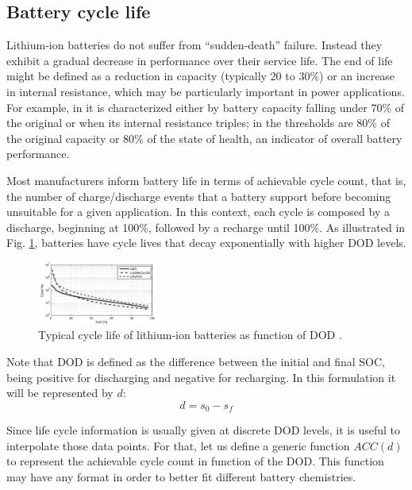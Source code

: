 \documentclass{ieeeaccess}
\begin{document}
    \subsection{Battery cycle life}
    Lithium-ion batteries do not suffer from ``sudden-death'' failure. Instead they exhibit a gradual decrease in performance over their service life. The end of life might be defined as a reduction in capacity (typically 20 to 30\%) or an increase in internal resistance, which may be particularly important in power applications. For example, in \cite{ECKER2014} it is characterized either by battery capacity falling under 70\% of the original or when its internal resistance triples; in \cite{NARAYAN2018} the thresholds are 80\% of the original capacity or 80\% of the state of health, an indicator of overall battery performance.

    Most manufacturers inform battery life in terms of achievable cycle count, that is, the number of charge/discharge events that a battery support before becoming unsuitable for a given application. In this context, each cycle is composed by a discharge, beginning at 100\%, followed by a recharge until 100\%. As illustrated in Fig. \ref{fig:acc_curves1}, batteries have cycle lives that decay exponentially with higher DOD levels.

    \begin{figure}[htbp]
        \centering
        \includegraphics[width=0.35\textwidth]{figures/acc_curves1.png}
        \caption{Typical cycle life of lithium-ion batteries as function of DOD \cite{XU2016}.}
        \label{fig:acc_curves1}
    \end{figure}

    Note that DOD is defined as the difference between the initial and final SOC, being positive for discharging and negative for recharging. In this formulation it will be represented by $d$:
    \begin{equation}
        d = s_{0}-s_{f}
        \label{eq:dod(s)}
    \end{equation}

    Since life cycle information is usually given at discrete DOD levels, it is useful to interpolate those data points. For that, let us define a generic function $ACC(d)$ to represent the achievable cycle count in function of the DOD. This function may have any format in order to better fit different battery chemistries.
\end{document}
